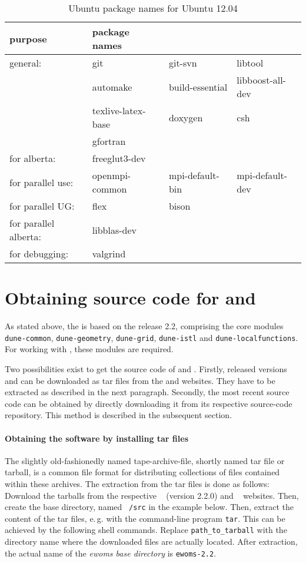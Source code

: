 \begin{table}
\centering
\caption{Ubuntu package names for Ubuntu 12.04}
\begin{tabular}{llll}
\toprule
\textbf{purpose} & \textbf{package names} \\
\midrule
general: & git & git-svn & libtool \\
& automake & build-essential & libboost-all-dev \\
& texlive-latex-base & doxygen & csh\\
& gfortran & \\
\midrule
for alberta: & freeglut3-dev &  \\
\midrule
for parallel use: & openmpi-common & mpi-default-bin & mpi-default-dev \\
\midrule
for parallel UG: & flex & bison & \\
\midrule
for parallel alberta: & libblas-dev &\\
\midrule
for debugging: & valgrind &\\
\bottomrule
\end{tabular}
\label{tbl:ubuntu-pkg}
\end{table}

\section{Obtaining source code for \Dune and \eWoms}

As stated above, the \eWoms is based on the \Dune release 2.2,
comprising the core modules \texttt{dune-common},
\texttt{dune-geometry}, \texttt{dune-grid}, \texttt{dune-istl} and
\texttt{dune-localfunctions}.  For working with \eWoms, these modules
are required.

Two possibilities exist to get the source code of \Dune and \eWoms.
Firstly, released versions \Dune and \eWoms can be downloaded as tar
files from the \Dune and \eWoms websites. They have to be extracted as
described in the next paragraph.  Secondly, the most recent source
code can be obtained by directly downloading it from its respective
source-code repository. This method is described in the subsequent
section.

\paragraph{Obtaining the software by installing tar files}

The slightly old-fashionedly named tape-archive-file, shortly named
tar file or tarball, is a common file format for distributing
collections of files contained within these archives.  The extraction
from the tar files is done as follows: Download the tarballs from the
respective \Dune~\cite{DUNE-HP} (version 2.2.0) and
\eWoms~\cite{EWOMS-HP} websites.  Then, create the {\Dune} base
directory, named \texttt{~/src} in the example below. Then, extract the
content of the tar files, e.\,g. with the command-line program
\texttt{tar}.  This can be achieved by the following shell
commands. Replace \texttt{path\_to\_tarball} with the directory name
where the downloaded files are actually located.  After extraction,
the actual name of the \emph{ewoms base directory} is
\texttt{ewoms-2.2}.

